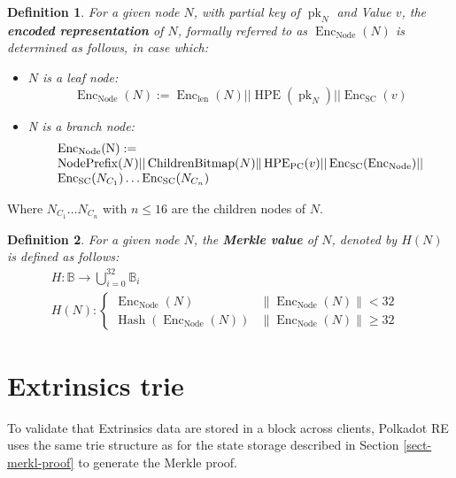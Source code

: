 \documentclass{article}
\newcommand{\assign}{:=}
\newcommand{\nobracket}{}
\newcommand{\nosymbol}{}
\newcommand{\tmop}[1]{\ensuremath{\operatorname{#1}}}
\newcommand{\tmrsub}[1]{\ensuremath{_{\textrm{#1}}}}
\newcommand{\tmstrong}[1]{\textbf{#1}}
\newcommand{\tmtextbf}[1]{{\bfseries{#1}}}
\newtheorem{definition}{Definition}
\providecommand{\nobracket}{}
\providecommand{\nosymbol}{}
\providecommand{\tmop}[1]{\ensuremath{\mathrm{#1}}}
\providecommand{\tmrsub}[1]{\tmrsub{\ensuremath{\mathrm{#1}}}}
\providecommand{\tmstrong}[1]{\tmtextbf{#1}}
\providecommand{\tmtextbf}[1]{\tmtextbf{#1}}
\newtheorem{definition}{Definition}
\begin{document}
\begin{definition}
  For a given node $N$, with partial key of $\tmop{pk}_N$ and Value $v$, the
  {\tmstrong{encoded representation}} of $N$, formally referred to as
  $\tmop{Enc}_{\tmop{Node}} (N)$ is determined as follows, in case which:
  \begin{itemize}
    \item $N$ is a leaf node:
    \[ \tmop{Enc}_{\tmop{Node}} (N) \assign \tmop{Enc}_{\tmop{len}} (N) ||
       \tmop{HPE} (\tmop{pk}_N) || \tmop{Enc}_{\tmop{SC}} (v) \]
    \item N is a branch node:
    \[ \begin{array}{l}
         \text{Enc\tmrsub{Node}(N)} \assign\\
         \nobracket \tmop{NodePrefix} (N) || \tmop{ChildrenBitmap} (N) \|
         \tmop{HPE}_{\tmop{PC}} (v) || \tmop{Enc}_{\tmop{SC}}
         (\tmop{Enc}_{\tmop{Node}}) ||\\
         \tmop{Enc}_{\tmop{SC}} (N_{C_1}) \ldots \tmop{Enc}_{\tmop{SC}}
         (N_{C_n})
       \end{array} \]
  \end{itemize}
\end{definition}

Where $N_{C_1} \ldots N_{C_n}$ with $n \leqslant 16$ are the children nodes of
$N$.

\begin{definition}
  For a given node $N$, the {\tmstrong{Merkle value}} of $N$, denoted by $H
  (N)$ is defined as follows:
  \[ \begin{array}{lll}
       & H : \mathbb{B} \rightarrow \bigcup_{i = 0^{\nosymbol}}^{32}
       \mathbb{B}_i & \\
       & H (N) : \left\{ \begin{array}{lll}
         \tmop{Enc}_{\tmop{Node}} (N) & \| \tmop{Enc}_{\tmop{Node}} (N)\|< 32
         & \\
         \tmop{Hash} (\tmop{Enc}_{\tmop{Node}} (N)) & \|
         \tmop{Enc}_{\tmop{Node}} (N)\| \geqslant 32 & 
       \end{array} \right. & 
     \end{array} \]
\end{definition}

\section{Extrinsics trie}

To validate that Extrinsics data are stored in a block across clients,
Polkadot RE uses the same trie structure as for the state storage described in
Section \ref{sect-merkl-proof} to generate the Merkle proof.
\end{document}
